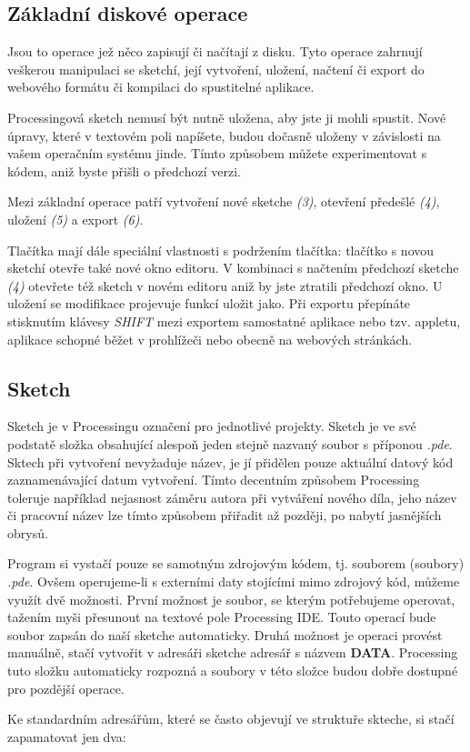 \documentclass[10pt]{book}
\newcommand{\pododdil}[1]{\subsection{#1}\index{#1}\label{#1}}
\newcommand{\klavesy}[1]{\textsc{\em #1}}
\newcommand{\slovnik}[1]{\textbf{\gls{#1}}\index{#1}\label{#1}}
\begin{document}
\pododdil{Základní diskové operace}

Jsou to operace jež něco zapisují či načítají z disku. Tyto operace zahrnují veškerou manipulaci se sketchí, její vytvoření, uložení, načtení či export do webového formátu či kompilaci do spustitelné aplikace.

Processingová sketch nemusí být nutně uložena, aby jste ji mohli spustit. Nové úpravy, které v textovém poli napíšete, budou dočasně uloženy v závislosti na vašem operačním systému jinde. Tímto způsobem můžete experimentovat s kódem, aniž byste přišli o předchozí verzi.

Mezi základní operace patří vytvoření nové sketche {\em (3)}, otevření předešlé {\em (4)}, uložení {\em (5)} a export {\em (6)}.

Tlačítka mají dále speciální vlastnosti s podržením tlačítka: tlačítko s novou sketchí otevře také nové okno editoru. V kombinaci s načtením předchozí sketche {\em (4)} otevřete též sketch v novém editoru aniž by jste ztratili předchozí okno. U uložení se modifikace projevuje funkcí uložit jako. Při exportu přepínáte stisknutím klávesy \klavesy{SHIFT} mezi exportem samostatné aplikace nebo tzv. appletu, aplikace schopné běžet v prohlížeči nebo obecně na webových stránkách.


\pododdil{Sketch}

Sketch je v Processingu označení pro jednotlivé projekty. Sketch je ve své podstatě složka obsahující alespoň jeden stejně nazvaný soubor s příponou {\em *.pde}. Sktech při vytvoření nevyžaduje název, je jí přidělen pouze aktuální datový kód zaznamenávající datum vytvoření. Tímto decentním způsobem Processing toleruje například nejasnost záměru autora při vytváření nového díla, jeho název či pracovní název lze tímto způsobem přiřadit až později, po nabytí jasnějších obrysů.

Program si vystačí pouze se samotným zdrojovým kódem, tj. souborem (soubory) {\em *.pde}. Ovšem operujeme-li s externími daty stojícími mimo zdrojový kód, můžeme využít dvě možnosti. První možnost je soubor, se kterým potřebujeme operovat, tažením myši přesunout na textové pole Processing IDE. Touto operací bude soubor zapsán do naší sketche automaticky. Druhá možnost je operaci provést manuálně, stačí vytvořit v adresáři sketche adresář s názvem \slovnik{DATA}. Processing tuto složku automaticky rozpozná a soubory v této složce budou dobře dostupné pro pozdější operace.

Ke standardním adresářům, které se často objevují ve struktuře skteche, si stačí zapamatovat jen dva:
\end{document}
